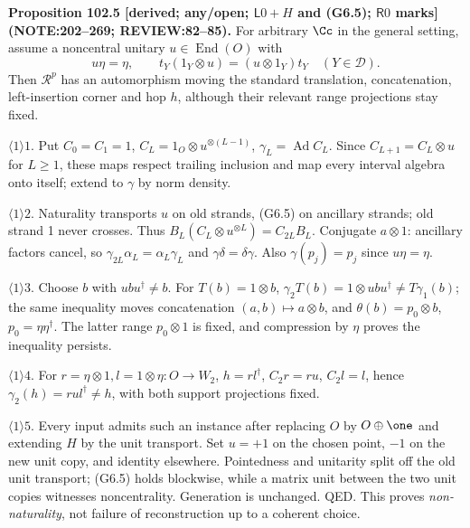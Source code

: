 \textbf{Proposition 102.5 [derived; any/open; \(\mathsf L0+H\) and (G6.5); \(\mathsf R0\) marks]\newline (NOTE:202--269; REVIEW:82--85).}
For arbitrary \(\Cc\) in the general setting, assume a noncentral unitary \(u\in\operatorname{End}(O)\) with
\[
 u\eta=\eta,\qquad t_Y(1_Y\otimes u)=(u\otimes1_Y)t_Y\quad(Y\in\mathcal D). \tag{G6.5}
\]
Then \(\mathcal R^p\) has an automorphism moving the standard translation, concatenation,
left-insertion corner and hop \(h\), although their relevant range projections stay fixed.
\par\(\langle1\rangle1\). Put \(C_0=C_1=1\), \(C_L=1_O\otimes u^{\otimes(L-1)}\),
\(\gamma_L=\operatorname{Ad}C_L\). Since \(C_{L+1}=C_L\otimes u\) for \(L\ge1\), these maps
respect trailing inclusion and map every interval algebra onto itself; extend to \(\gamma\) by norm density.
\par\(\langle1\rangle2\). Naturality transports \(u\) on old strands, (G6.5) on ancillary strands;
old strand 1 never crosses. Thus \(B_L(C_L\otimes u^{\otimes L})=C_{2L}B_L\).
Conjugate \(a\otimes1\): ancillary factors cancel, so \(\gamma_{2L}\alpha_L=\alpha_L\gamma_L\)
and \(\gamma\delta=\delta\gamma\). Also \(\gamma(p_j)=p_j\) since \(u\eta=\eta\).
\par\(\langle1\rangle3\). Choose \(b\) with \(ubu^\dagger\ne b\). For \(T(b)=1\otimes b\),
\(\gamma_2T(b)=1\otimes ubu^\dagger\ne T\gamma_1(b)\); the same inequality moves concatenation
\((a,b)\mapsto a\otimes b\), and \(\theta(b)=p_0\otimes b\), \(p_0=\eta\eta^\dagger\).
The latter range \(p_0\otimes1\) is fixed, and compression by \(\eta\) proves the inequality persists.
\par\(\langle1\rangle4\). For \(r=\eta\otimes1,l=1\otimes\eta:O\to W_2\), \(h=rl^\dagger\),
\(C_2r=ru\), \(C_2l=l\), hence \(\gamma_2(h)=rul^\dagger\ne h\), with both support projections fixed.
\par\(\langle1\rangle5\). Every input admits such an instance after replacing \(O\) by \(O\oplus\one\)
and extending \(H\) by the unit transport. Set \(u=+1\) on the chosen point, \(-1\) on the new unit copy,
and identity elsewhere. Pointedness and unitarity split off the old unit transport; (G6.5) holds blockwise,
while a matrix unit between the two unit copies witnesses noncentrality. Generation is unchanged. QED.
This proves \emph{non-naturality}, not failure of reconstruction up to a coherent choice.

